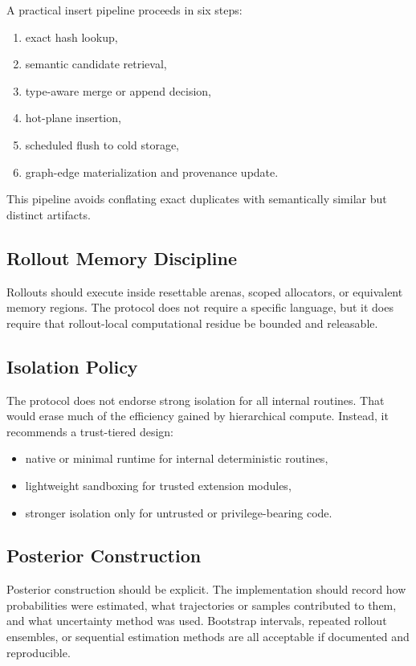 \documentclass[11pt]{article}
\theoremstyle{definition}
\begin{document}
A practical insert pipeline proceeds in six steps:
\begin{enumerate}[leftmargin=1.5em]
    \item exact hash lookup,
    \item semantic candidate retrieval,
    \item type-aware merge or append decision,
    \item hot-plane insertion,
    \item scheduled flush to cold storage,
    \item graph-edge materialization and provenance update.
\end{enumerate}

This pipeline avoids conflating exact duplicates with semantically similar but distinct artifacts.

\subsection{Rollout Memory Discipline}

Rollouts should execute inside resettable arenas, scoped allocators, or equivalent memory regions. The protocol does not require a specific language, but it does require that rollout-local computational residue be bounded and releasable.

\subsection{Isolation Policy}

The protocol does not endorse strong isolation for all internal routines. That would erase much of the efficiency gained by hierarchical compute. Instead, it recommends a trust-tiered design:
\begin{itemize}[leftmargin=1.5em]
    \item native or minimal runtime for internal deterministic routines,
    \item lightweight sandboxing for trusted extension modules,
    \item stronger isolation only for untrusted or privilege-bearing code.
\end{itemize}

\subsection{Posterior Construction}

Posterior construction should be explicit. The implementation should record how probabilities were estimated, what trajectories or samples contributed to them, and what uncertainty method was used. Bootstrap intervals, repeated rollout ensembles, or sequential estimation methods are all acceptable if documented and reproducible.
\end{document}
